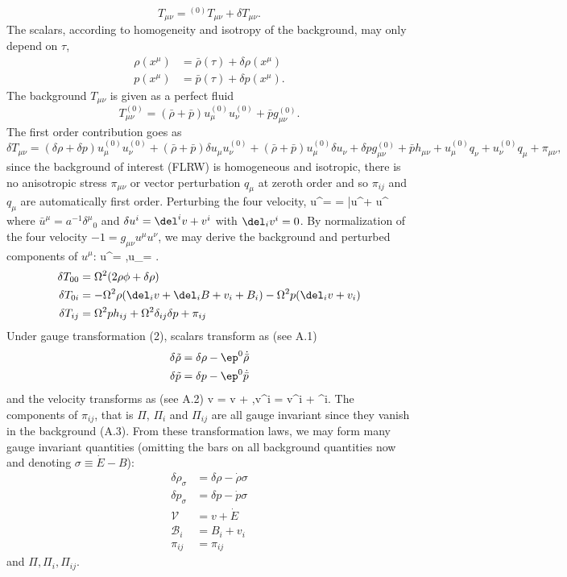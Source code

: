 \documentclass[10pt,letterpaper]{article}
\begin{document}
\[
	T_{\mu\nu} = {}^{(0)}T_{\mu\nu} + \delta T_{\mu\nu}.
\]
The scalars, according to homogeneity and isotropy of the background, may only depend on $\tau$, 
\begin{align}
	\rho(x^\mu) &= \bar \rho(\tau) + \delta \rho(x^\mu)\\
	p(x^\mu) &= \bar p(\tau) + \delta p(x^\mu).
\end{align}
The background $T_{\mu\nu}$ is given as a perfect fluid
\[
	T^{(0)}_{\mu\nu} = (\bar\rho + \bar p)u^{(0)}_\mu u^{(0)}_\nu + \bar p g^{(0)}_{\mu\nu}.
\]
The first order contribution goes as
\[
	\delta T_{\mu\nu} = (\delta\rho + \delta p)u^{(0)}_{\mu}u^{(0)}_\nu + (\bar\rho+\bar p)\delta u_\mu u^{(0)}_\nu + (\bar\rho+\bar p)u^{(0)}_\mu \delta u_\nu + \delta p g^{(0)}_{\mu\nu} + \bar p h_{\mu\nu} + u^{(0)}_\mu q_\nu + u^{(0)}_\nu q_\mu + \pi_{\mu\nu},
\]
since the background of interest (FLRW) is homogeneous and isotropic, there is no anisotropic stress $\pi_{\mu\nu}$ or vector perturbation $q_\mu$ at zeroth order and so $\pi_{ij}$ and $q_\mu$ are automatically first order.
Perturbing the four velocity,
\be
	u^\mu = = \bar u^\mu + \delta u^\mu
\ee
where $\bar u^\mu = a^{-1} \delta^\mu{}_0$ and $\delta u^i = \del^i v + v^i$ with $\del_i v^i = 0$. By normalization of the four velocity $-1 = g_{\mu\nu}u^\mu u^\nu$, we may derive the background and perturbed components of $u^\mu$:
\be
	u^\mu = ,\qquad u_\mu = \Omega{}.
\ee
\begin{align}
	\delta T_{00} &= \Omega^2(2\rho \phi + \delta \rho)\\
	\delta T_{0i} &= -\Omega^2\rho(\del_i v + \del_i B + v_i + B_i)-\Omega^2 p(\del_i v + v_i)\\
	\delta T_{ij} &= \Omega^2ph_{ij} + \Omega^2 \delta_{ij} \delta p + \pi_{ij}
\end{align}
Under gauge transformation (2), scalars transform as (see A.1)
\begin{align}
	\delta \tilde \rho &= \delta \rho - \ep^0 \dot{\bar\rho}\\
\delta \tilde p &= \delta p - \ep^0 \dot{\bar p}
\end{align}
and the velocity transforms as (see A.2)
\be
	\tilde v = v + \dot \ep,\quad \tilde v^i = v^i + \dot \ep^i.
\ee
The components of $\pi_{ij}$, that is $\Pi$, $\Pi_i$ and $\Pi_{ij}$ are all gauge invariant since they vanish in the background (A.3). From these transformation laws, we may form many gauge invariant quantities (omitting the bars on all background quantities now and denoting $\sigma \equiv \dot E-B$):
\begin{align}
	\delta \rho_\sigma &= \delta \rho - \dot\rho\sigma \\
	\delta p_\sigma &= \delta p - \dot p\sigma\\
	\mathcal V &= v+\dot E\\
	\mathcal B_i &= B_i + v_i\\
	\pi_{ij} &= \pi_{ij}
\end{align}
and $\Pi, \Pi_i, \Pi_{ij}$. 
\\ \\
\end{document}
